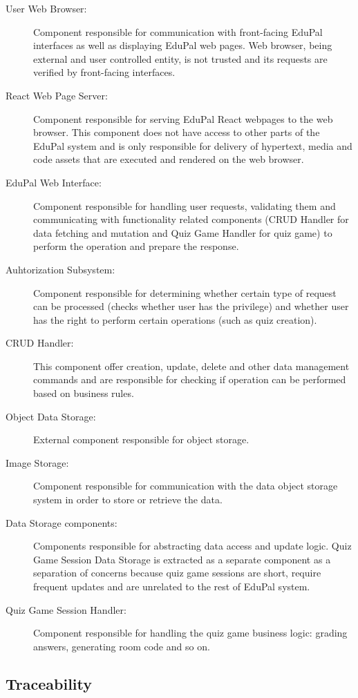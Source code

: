 \begin{description}
  \item[User Web Browser:] Component responsible for communication with front-facing EduPal interfaces as well as displaying EduPal web pages. Web browser, being external and user controlled entity, is not trusted and its requests are verified by front-facing interfaces.
  \item[React Web Page Server:] Component responsible for serving EduPal React webpages to the web browser. This component does not have access to other parts of the EduPal system and is only responsible for delivery of hypertext, media and code assets that are executed and rendered on the web browser.
  \item[EduPal Web Interface:] Component responsible for handling user requests, validating them and communicating with functionality related components (CRUD Handler for data fetching and mutation and Quiz Game Handler for quiz game) to perform the operation and prepare the response.
  \item[Auhtorization Subsystem:] Component responsible for determining whether certain type of request can be processed (checks whether user has the privilege) and whether user has the right to perform certain operations (such as quiz creation).
  \item[CRUD Handler:] This component offer creation, update, delete and other data management commands and are responsible for checking if operation can be performed based on business rules.
  \item[Object Data Storage:] External component responsible for object storage. 
  \item[Image Storage:] Component responsible for communication with the data object storage system in order to store or retrieve the data.
  \item[Data Storage components:] Components responsible for abstracting data access and update logic. Quiz Game Session Data Storage is extracted as a separate component as a separation of concerns because quiz game sessions are short, require frequent updates and are unrelated to the rest of EduPal system.
  \item[Quiz Game Session Handler:] Component responsible for handling the quiz game business logic: grading answers, generating room code and so on.
\end{description}

\subsection{Traceability}

